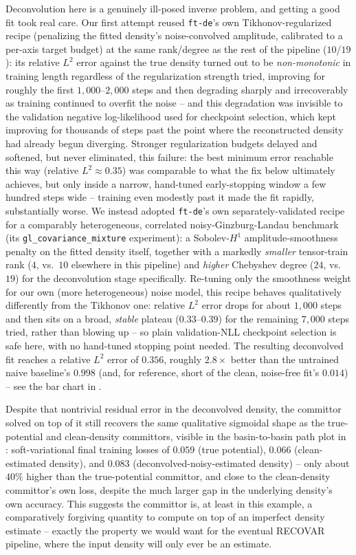 \documentclass[11pt]{amsart}
\begin{document}
Deconvolution here is a genuinely ill-posed inverse problem, and getting a good fit took real care. Our first attempt reused \texttt{ft-de}'s own Tikhonov-regularized recipe (penalizing the fitted density's noise-convolved amplitude, calibrated to a per-axis target budget) at the same rank/degree as the rest of the pipeline ($10$/$19$): its relative $L^2$ error against the true density turned out to be \emph{non-monotonic} in training length regardless of the regularization strength tried, improving for roughly the first $1{,}000$--$2{,}000$ steps and then degrading sharply and irrecoverably as training continued to overfit the noise -- and this degradation was invisible to the validation negative log-likelihood used for checkpoint selection, which kept improving for thousands of steps past the point where the reconstructed density had already begun diverging. Stronger regularization budgets delayed and softened, but never eliminated, this failure: the best minimum error reachable this way (relative $L^2\approx0.35$) was comparable to what the fix below ultimately achieves, but only inside a narrow, hand-tuned early-stopping window a few hundred steps wide -- training even modestly past it made the fit rapidly, substantially worse. We instead adopted \texttt{ft-de}'s own separately-validated recipe for a comparably heterogeneous, correlated noisy-Ginzburg-Landau benchmark (its \texttt{gl\_covariance\_mixture} experiment): a Sobolev-$H^1$ amplitude-smoothness penalty on the fitted density itself, together with a markedly \emph{smaller} tensor-train rank ($4$, vs.\ $10$ elsewhere in this pipeline) and \emph{higher} Chebyshev degree ($24$, vs.\ $19$) for the deconvolution stage specifically. Re-tuning only the smoothness weight for our own (more heterogeneous) noise model, this recipe behaves qualitatively differently from the Tikhonov one: relative $L^2$ error drops for about $1{,}000$ steps and then sits on a broad, \emph{stable} plateau ($0.33$--$0.39$) for the remaining $7{,}000$ steps tried, rather than blowing up -- so plain validation-NLL checkpoint selection is safe here, with no hand-tuned stopping point needed. The resulting deconvolved fit reaches a relative $L^2$ error of $0.356$, roughly $2.8\times$ better than the untrained naive baseline's $0.998$ (and, for reference, short of the clean, noise-free fit's $0.014$) -- see the bar chart in .

Despite that nontrivial residual error in the deconvolved density, the committor solved on top of it still recovers the same qualitative sigmoidal shape as the true-potential and clean-density committors, visible in the basin-to-basin path plot in : soft-variational final training losses of $0.059$ (true potential), $0.066$ (clean-estimated density), and $0.083$ (deconvolved-noisy-estimated density) -- only about $40\%$ higher than the true-potential committor, and close to the clean-density committor's own loss, despite the much larger gap in the underlying density's own accuracy. This suggests the committor is, at least in this example, a comparatively forgiving quantity to compute on top of an imperfect density estimate -- exactly the property we would want for the eventual RECOVAR pipeline, where the input density will only ever be an estimate.
\end{document}
